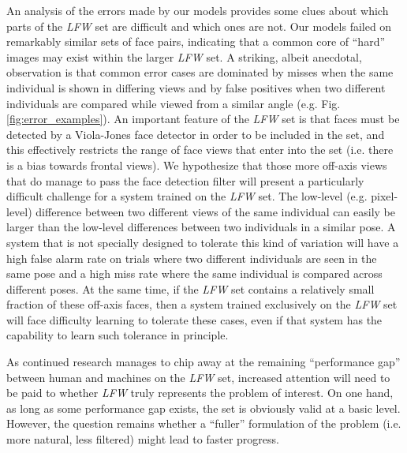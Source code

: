 An analysis of the errors made by our models provides some clues about which
parts of the \emph{LFW} set are difficult and which ones are not.  Our models
failed on remarkably similar sets of face pairs, indicating that a common core
of ``hard'' images may exist within the larger \emph{LFW} set.  A striking,
albeit anecdotal, observation is that common error cases are dominated by misses
when the same individual is shown in differing views and by false positives
when two different individuals are compared while viewed from a similar angle
(e.g. Fig. \ref{fig:error_examples}).  An important feature of the \emph{LFW}
set is that faces must be detected by a Viola-Jones face detector in order to be
included in the set, and this effectively restricts the range of face views that
enter into the set (i.e. there is a bias towards frontal views).  We hypothesize
that those more off-axis views that do manage to pass the face detection filter
will present a particularly difficult challenge for a system trained on
the \emph{LFW} set.  The low-level (e.g. pixel-level) difference between two
different views of the same individual can easily be larger than the low-level
differences between two individuals in a similar pose.  A system that is not
specially designed to tolerate this kind of variation will have a high false
alarm rate on trials where two different individuals are seen in the same pose
and a high miss rate where the same individual is compared across different
poses.  At the same time, if the \emph{LFW} set contains a relatively small
fraction of these off-axis faces, then a system trained exclusively on
the \emph{LFW} set will face difficulty learning to tolerate these cases, even
if that system has the capability to learn such tolerance in principle.

As continued research manages to chip away at the remaining ``performance gap''
between human and machines on the \emph{LFW} set, increased attention will need
to be paid to whether \emph{LFW} truly represents the problem of interest.  On
one hand, as long as some performance gap exists, the set is obviously valid at
a basic level.  However, the question remains whether a ``fuller'' formulation
of the problem (i.e. more natural, less filtered) might lead to faster progress.


